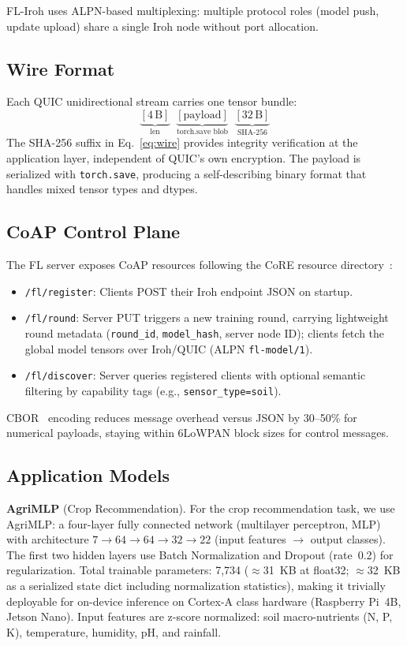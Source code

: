 \documentclass[a4paper,fleqn]{cas-dc}
\begin{document}
FL-Iroh uses ALPN-based multiplexing: multiple protocol roles (model push, update upload) share a single Iroh node without port allocation.

\subsection{Wire Format}

Each QUIC unidirectional stream carries one tensor bundle:
\begin{equation}
\underbrace{[4\,\text{B}]}_{\text{len}} \;\; \underbrace{[\text{payload}]}_{\text{torch.save blob}} \;\; \underbrace{[32\,\text{B}]}_{\text{SHA-256}}
\label{eq:wire}
\end{equation}
The SHA-256 suffix in Eq.~\eqref{eq:wire} provides integrity verification at the application layer, independent of QUIC's own encryption. The payload is serialized with \texttt{torch.save}, producing a self-describing binary format that handles mixed tensor types and dtypes.

\subsection{CoAP Control Plane}

The FL server exposes CoAP resources following the CoRE resource directory~\cite{rfc6690}:
\begin{itemize}
    \item \texttt{/fl/register}: Clients POST their Iroh endpoint JSON on startup.
    \item \texttt{/fl/round}: Server PUT triggers a new training round, carrying lightweight round metadata (\texttt{round\_id}, \texttt{model\_hash}, server node ID); clients fetch the global model tensors over Iroh/QUIC (ALPN \texttt{fl-model/1}).
    \item \texttt{/fl/discover}: Server queries registered clients with optional semantic filtering by capability tags (e.g., \texttt{sensor\_type=soil}).
\end{itemize}

CBOR~\cite{rfc8949} encoding reduces message overhead versus JSON by 30--50\% for numerical payloads, staying within 6LoWPAN block sizes for control messages.

\subsection{Application Models}

\textbf{AgriMLP} (Crop Recommendation). For the crop recommendation task, we use AgriMLP: a four-layer fully connected network (multilayer perceptron, MLP) with architecture $7 \to 64 \to 64 \to 32 \to 22$ (input features $\to$ output classes). The first two hidden layers use Batch Normalization and Dropout (rate~0.2) for regularization. Total trainable parameters: 7{,}734 ($\approx$31~KB at float32; $\approx$32~KB as a serialized state dict including normalization statistics), making it trivially deployable for on-device inference on Cortex-A class hardware (Raspberry Pi~4B, Jetson Nano). Input features are z-score normalized: soil macro-nutrients (N, P, K), temperature, humidity, pH, and rainfall.
\end{document}
